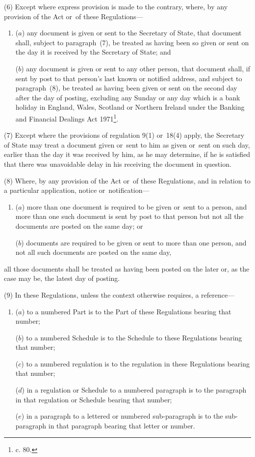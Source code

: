 \documentclass[a4paper,12pt]{article}
\begin{document}
(6) Except where express provision is made to the contrary, where, by any provision of the Act or~of these Regulations—
\begin{enumerate}\item[]
($a$) any document is given or sent to the Secretary of State, that document shall, subject to paragraph~(7), be treated as having been so given or sent on the day it is received by the Secretary of State; and

($b$) any document is given or sent to any 
other  %
person, that document shall, if sent by post to that person’s last known or notified address, and subject to paragraph~(8), be treated as having been given or sent on the second day after the day of posting, excluding any Sunday or any day which is a bank holiday in England, Wales, Scotland or Northern Ireland under the Banking and Financial Dealings Act 1971\footnote{ c. 80.}.
\end{enumerate}

(7) Except where the provisions of regulation 
9(1) or~18(4)  %
apply, the Secretary of State may treat a document given or~sent to him as given or~sent on such day, earlier than the day it was received by him, as he may determine, if he is satisfied that there was unavoidable delay in his receiving the document in question.

(8) Where, by any provision of the Act or~of these Regulations, and in relation to a particular application, notice or~notification—
\begin{enumerate}\item[]
($a$) more than one document is required to be given or~sent to a person, and more than one such document is sent by post to that person but not all the documents are posted on the same day; or

($b$) documents are required to be given or sent to more than one person, and not all such documents are posted on the same day,
\end{enumerate}
all those documents shall be treated as having been posted on the later or, as the case may be, the latest day of posting.

(9) In these Regulations, unless the context otherwise requires, a reference—
\begin{enumerate}\item[]
($a$) to a numbered Part is to the Part of these Regulations bearing that number;

($b$) to a numbered Schedule is to the Schedule to these Regulations bearing that number;

($c$) to a numbered regulation is to the regulation in these Regulations bearing that number;

($d$) in a regulation or Schedule to a numbered paragraph is to the paragraph in that regulation or Schedule bearing that number;

($e$) in a paragraph to a lettered or numbered sub-paragraph is to the sub-paragraph in that paragraph bearing that letter or number.
\end{enumerate}
\end{document}
